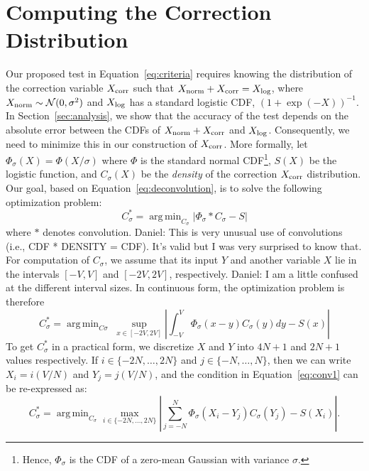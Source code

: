 \documentclass{article}
\DeclareMathOperator*{\argmin}{arg\,min}
\begin{document}
\section{Computing the Correction Distribution}\label{sec:correction}

Our proposed test in Equation~\ref{eq:criteria} requires knowing the
distribution of the correction variable $X_{\rm corr}$ such that $X_{\rm norm} +
X_{\rm corr} = X_{\rm log}$, where $X_{\rm norm} \sim \mathcal{N}(0,\sigma^2)$
and $X_{\rm log}$ has a standard logistic CDF, $(1+\exp(-X))^{-1}$. In
Section~\ref{sec:analysis}, we show that the accuracy of the test depends on the
absolute error between the CDFs of $X_{\rm norm} + X_{\rm corr}$ and $X_{\rm
log}$. Consequently, we need to minimize this in our construction of $X_{\rm
corr}$. More formally, let $\Phi_\sigma(X) = \Phi(X/\sigma)$ where $\Phi$ is the
standard normal CDF\footnote{Hence, $\Phi_\sigma$ is the CDF of a zero-mean
Gaussian with variance $\sigma$.}, $S(X)$ be the logistic function, and
$C_{\sigma}(X)$ be the \emph{density} of the correction $X_{\rm corr}$
distribution. Our goal, based on Equation~\ref{eq:deconvolution}, is to solve
the following optimization problem:
\begin{equation}\label{eq:overall_corr_problem}
    C_\sigma^* = \argmin_{C_\sigma} |\Phi_{\sigma} * C_{\sigma} - S|
\end{equation}
where $*$ denotes convolution. {\color{blue} Daniel: This is very unusual use of
convolutions (i.e., CDF * DENSITY = CDF). It's valid but I was very surprised to
know that.} For computation of $C_\sigma$, we assume that its input $Y$ and
another variable $X$ lie in the intervals $[-V,V]$ and $[-2V,2V]$, respectively.
{\color{blue} Daniel: I am a little confused at the different interval sizes.}
In continuous form, the optimization problem is therefore
\begin{equation}\label{eq:conv1}
    C_\sigma^* = \argmin_{C\sigma} \; \sup_{x \in [-2V,2V]}\left|\int_{-V}^{V}\Phi_{\sigma}(x-y) C_{\sigma}(y)dy - S(x)\right|
\end{equation}
To get $C_\sigma^*$ in a practical form, we discretize $X$ and $Y$ into $4N+1$
and $2N+1$ values respectively. If $i \in \{-2N, \ldots, 2N\}$ and $j \in \{-N,
\ldots, N\}$, then we can write $X_i = i(V/N)$ and $Y_j = j(V/N)$, and the
condition in Equation~\ref{eq:conv1} can be re-expressed as:
\begin{equation}\label{eq:conv2}
    C_\sigma^* = \argmin_{C_\sigma} \max_{i \in \{-2N,\ldots,2N\}}\left|\sum_{j = -N}^{N}\Phi_{\sigma}(X_i-Y_j) C_{\sigma}(Y_j) - S(X_i)\right|.
\end{equation}
\end{document}
